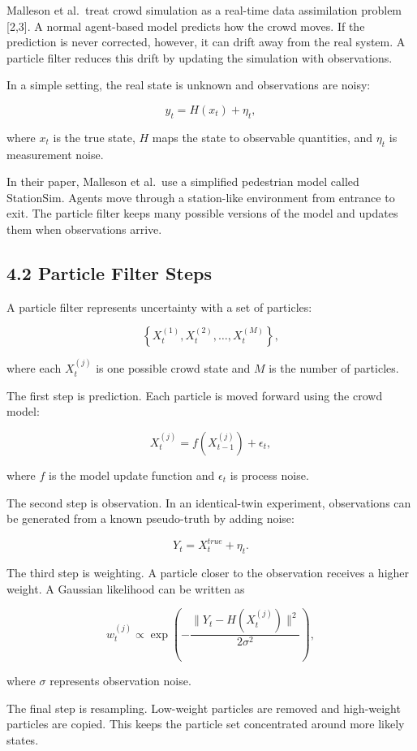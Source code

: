 \documentclass[
  11pt,
]{article}
\begin{document}
Malleson et al.~treat crowd simulation as a real-time data assimilation
problem {[}2,3{]}. A normal agent-based model predicts how the crowd
moves. If the prediction is never corrected, however, it can drift away
from the real system. A particle filter reduces this drift by updating
the simulation with observations.

In a simple setting, the real state is unknown and observations are
noisy:

\[
y_t = H(x_t) + \eta_t,
\]

where \(x_t\) is the true state, \(H\) maps the state to observable
quantities, and \(\eta_t\) is measurement noise.

In their paper, Malleson et al.~use a simplified pedestrian model called
StationSim. Agents move through a station-like environment from entrance
to exit. The particle filter keeps many possible versions of the model
and updates them when observations arrive.

\subsection{4.2 Particle Filter Steps}\label{particle-filter-steps}

A particle filter represents uncertainty with a set of particles:

\[
\left\{X_t^{(1)}, X_t^{(2)}, \ldots, X_t^{(M)}\right\},
\]

where each \(X_t^{(j)}\) is one possible crowd state and \(M\) is the
number of particles.

The first step is prediction. Each particle is moved forward using the
crowd model:

\[
X_t^{(j)} = f(X_{t-1}^{(j)}) + \epsilon_t,
\]

where \(f\) is the model update function and \(\epsilon_t\) is process
noise.

The second step is observation. In an identical-twin experiment,
observations can be generated from a known pseudo-truth by adding noise:

\[
Y_t = X_t^{true} + \eta_t.
\]

The third step is weighting. A particle closer to the observation
receives a higher weight. A Gaussian likelihood can be written as

\[
w_t^{(j)}
\propto
\exp\left(
-\frac{\|Y_t - H(X_t^{(j)})\|^2}{2\sigma^2}
\right),
\]

where \(\sigma\) represents observation noise.

The final step is resampling. Low-weight particles are removed and
high-weight particles are copied. This keeps the particle set
concentrated around more likely states.
\end{document}
